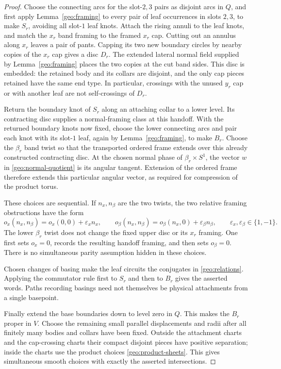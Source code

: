 \begin{proof}
Choose the connecting arcs for the slot-$2,3$ pairs as disjoint arcs
in $Q$, and first apply Lemma~\ref{geo:framing} to every pair of leaf
occurrences in slots $2,3$, to make $S_r$, avoiding all slot-$1$ leaf knots.
Attach the rising annuli to the leaf knots, and match the $x_r$ band
framing to the framed $x_r$ cap.  Cutting out an annulus along $x_r$
leaves a pair of pants.  Capping its two new boundary circles by
nearby copies of the $x_r$ cap gives a disc $D_r$.  The extended
lateral normal field supplied by Lemma~\ref{geo:framing} places
the two copies at the cut band sides.  This disc is embedded:
the retained body and its collars are disjoint, and the only cap
pieces retained have the same end type.  In particular, crossings
with the unused $y_r$ cap or with another leaf are not self-crossings
of $D_r$.

Return the boundary knot of $S_r$ along an attaching collar to a
lower level.  Its contracting disc supplies a normal-framing class
at this handoff.  With the returned boundary knots now fixed, choose
the lower connecting arcs and pair each knot with its slot-$1$ leaf, again by
Lemma~\ref{geo:framing}, to make $B_r$.  Choose the
$\beta_r$ band twist so that the transported ordered frame extends
over this already constructed contracting disc.  At the chosen
normal phase of $\beta_r\times S^1$, the vector $w$ in
\eqref{geo:normal-quotient} is its angular tangent.  Extension of
the ordered frame therefore extends this particular angular
vector, as required for compression of the product torus.

These choices are sequential.  If $n_x,n_\beta$ are the two twists,
the two relative framing obstructions have the form
\[
 o_x(n_x,n_\beta)=o_x(0,0)+\varepsilon_x n_x,
 \qquad
 o_\beta(n_x,n_\beta)=o_\beta(n_x,0)
                           +\varepsilon_\beta n_\beta,
 \qquad \varepsilon_x,\varepsilon_\beta\in\{1,-1\}.
\]
The lower $\beta_r$ twist does not change the fixed upper disc or
its $x_r$ framing.  One first sets $o_x=0$, records the resulting
handoff framing, and then sets $o_\beta=0$.  There is no simultaneous
parity assumption hidden in these choices.

Chosen changes of basing make the leaf circuits the conjugates in
\eqref{geo:relations}.  Applying the commutator rule first to $S_r$
and then to $B_r$ gives the asserted words.  Paths recording basings
need not themselves be physical attachments from a single basepoint.

Finally extend the base boundaries down to level zero in $Q$.
This makes the $B_r$ proper in $V$.  Choose the remaining small
parallel displacements and radii after all finitely many bodies
and collars have been fixed.  Outside the attachment charts and
the cap-crossing charts their compact disjoint pieces have positive
separation; inside the charts use the product choices
\eqref{geo:product-sheets}.  This gives simultaneous smooth choices
with exactly the asserted intersections.
\end{proof}

